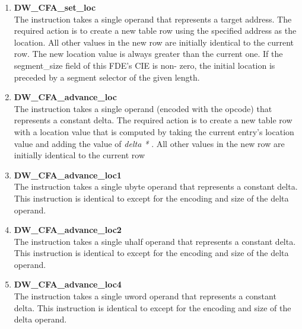 \begin{enumerate}[1.]

\item \textbf{DW\-\_CFA\-\_set\-\_loc} \\
The  instruction takes a single operand that
represents a target address. The required action is to create a
new table row using the specified address as the location. All
other values in the new row are initially identical to the
current row. The new location value is always greater than
the current one. If the segment\_size field of this FDE's CIE
is non- zero, the initial location is preceded by a segment
selector of the given length.


\item \textbf{DW\-\_CFA\-\_advance\-\_loc} \\
The  instruction takes a single operand (encoded
with the opcode) that represents a constant delta. The required
action is to create a new table row with a location value that
is computed by taking the current entry’s location value
and adding the value of 
\textit{delta * }. 
All
other values in the new row are initially identical to the
current row

\item \textbf{DW\-\_CFA\-\_advance\-\_loc1} \\
The  instruction takes a single ubyte
operand that represents a constant delta. This instruction
is identical to  except for the encoding
and size of the delta operand.

\item \textbf{DW\-\_CFA\-\_advance\-\_loc2} \\
The  instruction takes a single uhalf
operand that represents a constant delta. This instruction
is identical to  except for the encoding
and size of the delta operand.

\item \textbf{DW\-\_CFA\-\_advance\-\_loc4} \\
The  instruction takes a single uword
operand that represents a constant delta. This instruction
is identical to  except for the encoding
and size of the delta operand.

\end{enumerate}


